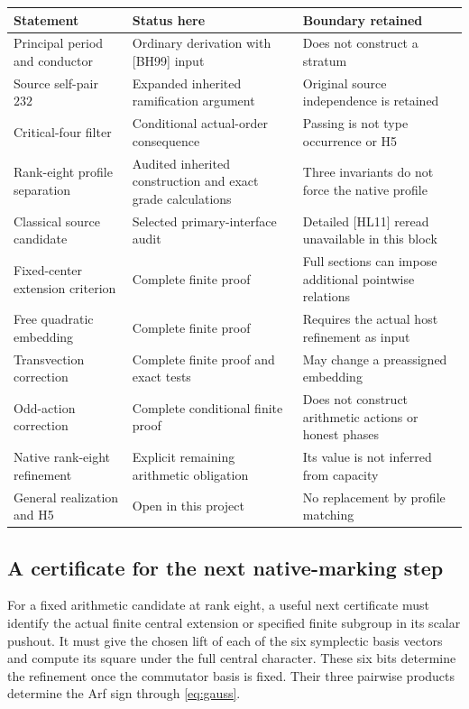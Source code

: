 \begin{longtable}{@{}>{\raggedright\arraybackslash}p{}>{\raggedright\arraybackslash}p{}>{\raggedright\arraybackslash}p{}@{}}
\toprule
Statement & Status here & Boundary retained\\\midrule\endhead
Principal period and conductor & Ordinary derivation with [BH99] input & Does not construct a stratum\\[3pt]
Source self-pair $232$ & Expanded inherited ramification argument & Original source independence is retained\\[3pt]
Critical-four filter & Conditional actual-order consequence & Passing is not type occurrence or H5\\[3pt]
Rank-eight profile separation & Audited inherited construction and exact grade calculations & Three invariants do not force the native profile\\[3pt]
Classical source candidate & Selected primary-interface audit & Detailed [HL11] reread unavailable in this block\\[3pt]
Fixed-center extension criterion & Complete finite proof & Full sections can impose additional pointwise relations\\[3pt]
Free quadratic embedding & Complete finite proof & Requires the actual host refinement as input\\[3pt]
Transvection correction & Complete finite proof and exact tests & May change a preassigned embedding\\[3pt]
Odd-action correction & Complete conditional finite proof & Does not construct arithmetic actions or honest phases\\[3pt]
Native rank-eight refinement & Explicit remaining arithmetic obligation & Its value is not inferred from capacity\\[3pt]
General realization and H5 & Open in this project & No replacement by profile matching\\\bottomrule
\end{longtable}

\subsection{A certificate for the next native-marking step}
For a fixed arithmetic candidate at rank eight, a useful next certificate must identify the actual finite central extension or specified finite subgroup in its scalar pushout. It must give the chosen lift of each of the six symplectic basis vectors and compute its square under the full central character. These six bits determine the refinement once the commutator basis is fixed. Their three pairwise products determine the Arf sign through \eqref{eq:gauss}.

